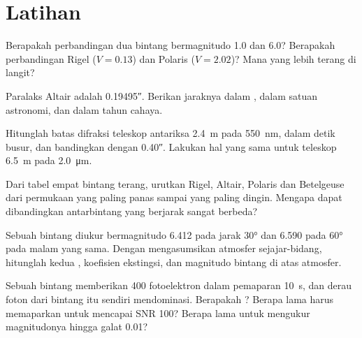 \section{Latihan}

\begin{exercise}[$\star$]\label{exo:b1:observing-the-sky:1}
Berapakah perbandingan  dua bintang bermagnitudo 1.0 dan 6.0? Berapakah perbandingan  Rigel ($V = 0.13$) dan Polaris ($V = 2.02$)? Mana yang lebih terang di langit?
\end{exercise}

\begin{exercise}[$\star$]\label{exo:b1:observing-the-sky:2}
Paralaks Altair adalah \ang{;;0.19495}. Berikan jaraknya dalam , dalam satuan astronomi, dan dalam tahun cahaya.
\end{exercise}

\begin{exercise}[$\star$]\label{exo:b1:observing-the-sky:3}
Hitunglah batas difraksi teleskop antariksa \qty{2.4}{m} pada \qty{550}{nm}, dalam detik busur, dan bandingkan dengan  \ang{;;0.40}. Lakukan hal yang sama untuk teleskop \qty{6.5}{m} pada \qty{2.0}{\micro\metre}.
\end{exercise}

\begin{exercise}[$\star$]\label{exo:b1:observing-the-sky:4}
Dari tabel empat bintang terang, urutkan Rigel, Altair, Polaris dan Betelgeuse dari permukaan yang paling panas sampai yang paling dingin. Mengapa  dapat dibandingkan antarbintang yang berjarak sangat berbeda?
\end{exercise}

\begin{exercise}[$\star\star$]\label{exo:b1:observing-the-sky:5}
Sebuah bintang diukur bermagnitudo 6.412 pada jarak  \ang{30} dan 6.590 pada \ang{60} pada malam yang sama. Dengan mengasumsikan atmosfer sejajar-bidang, hitunglah kedua , koefisien ekstingsi, dan magnitudo bintang di atas atmosfer.
\end{exercise}

\begin{exercise}[$\star\star$]\label{exo:b1:observing-the-sky:6}
Sebuah bintang memberikan 400 fotoelektron dalam pemaparan \qty{10}{s}, dan derau foton dari bintang itu sendiri mendominasi. Berapakah ? Berapa lama harus memaparkan untuk mencapai SNR 100? Berapa lama untuk mengukur magnitudonya hingga galat \num{0.01}?
\end{exercise}

